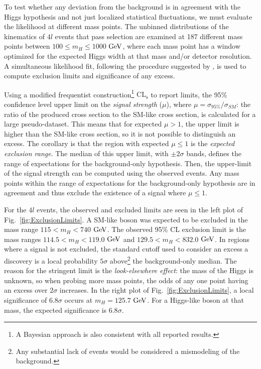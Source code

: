 To test whether any deviation from the background is in agreement with the Higgs hypothesis and not just localized statistical fluctuations, we must evaluate the likelihood at different mass points. The unbinned distributions of the kinematics of $4l$ events that pass selection are examined at 187 different mass points between $100\leq m_{H} \leq 1000$ $\rm{GeV}$, where each mass point has a window optimized for the expected Higgs width at that mass and/or detector resolution. A simultaneous likelihood fit, following the procedure suggested by \cite{LHC-HCG}, is used to compute exclusion limits and significance of any excess.

Using a modified frequentist construction\footnote{A Bayesian approach \cite{PDG} is also consistent with all reported results.} $\mathrm{CL_s}$ \cite{LHC-HCG,Junk,LEP_CLs} to report limits, the 95\% confidence level upper limit on the \textit{signal strength} ($\mu$), where $\mu=\sigma_{95\%}/\sigma_{SM}$: the ratio of the produced cross section to the SM-like cross section, is calculated for a large pseudo-dataset. This means that for expected $\mu>1$, the upper limit is higher than the SM-like cross section, so it is not possible to distinguish an excess. The corollary is that the region with expected $\mu\leq1$ is the \textit{expected exclusion range}. The median of this upper limit, with $\pm2\sigma$ bands, defines the range of expectations for the background-only hypothesis. Then, the upper-limit of the signal strength can be computed using the observed events. Any mass points within the range of expectations for the background-only hypothesis are in agreement and thus exclude the existence of a signal where $\mu\leq1$.

For the $4l$ events, the observed and excluded limits are seen in the left plot of Fig.~\ref{fig:ExclusionLimits}. A SM-like boson was expected to be excluded in the mass range $115< m_H <740$ $\rm{GeV}$. The observed 95\% CL exclusion limit is the mass ranges $114.5<m_H<119.0$ $\rm{GeV}$ and $129.5<m_H<832.0$ $\rm{GeV}$. In regions where a signal is not excluded, the standard cutoff used to consider an excess a discovery is a local probability $5\sigma$ above\footnote{Any substantial lack of events would be considered a mismodeling of the background.} the background-only median. The reason for the stringent limit is the \textit{look-elsewhere effect}: the mass of the Higgs is unknown, so when probing more mass points, the odds of any one point having an excess over $2\sigma$ increases. In the right plot of Fig.~\ref{fig:ExclusionLimits}, a local significance of $6.8\sigma$ occurs at $m_H=125.7$ $\rm{GeV}$. For a Higgs-like boson at that mass, the expected significance is $6.8\sigma$.

